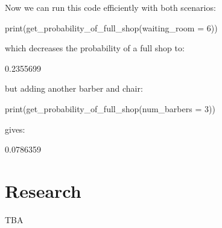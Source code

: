Now we can run this code efficiently with both scenarios:

\begin{Rin}
print(get_probability_of_full_shop(waiting_room = 6))
\end{Rin}

which decreases the probability of a full shop to:

\begin{Rout}
[1] 0.2355699
\end{Rout}

but adding another barber and chair:

\begin{Rin}
print(get_probability_of_full_shop(num_barbers = 3))
\end{Rin}

gives:

\begin{Rout}
[1] 0.0786359
\end{Rout}

\section{Research}\label{sec:research}

TBA

